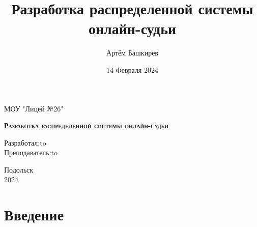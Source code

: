 \documentclass[a4paper, 12pt]{article}
\title{Разработка распределенной системы онлайн-судьи}
\author{Артём Башкирев}
\date{14 Февраля 2024}
\begin{document}
\begin{titlepage}
    \newpage
    
    \begin{center}
    МОУ "Лицей №26" \\
    \end{center}
    
    \vspace{8em}
    
    \vspace{2em}
    
    \begin{center}
    \textsc{\textbf{Разработка распределенной системы онлайн-судьи}}
    \end{center}
    
    \vspace{10em}
    
    \newbox{\lbox}
    \newlength{\maxl}
    \setlength{\maxl}{\wd\lbox}
    \hfill\parbox{11cm}{
    \hspace*{5cm}\hspace*{-5cm}Разработал:\hfill\hbox to\\
    \hspace*{5cm}\hspace*{-5cm}Преподаватель:\hfill\hbox to\\
    }
    
    \vspace{\fill}
    
    \begin{center}
    Подольск \\2024
    \end{center}
    
\end{titlepage}
\thispagestyle{empty}

\newpage
    \tableofcontents
\newpage


    \section{Введение}
    
\newpage
\end{document}
